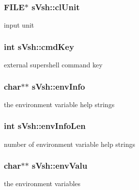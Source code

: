 \subsubsection[{cl\-Unit}]{\setlength{\rightskip}{0pt plus 5cm}F\-I\-L\-E$\ast$ s\-Vsh\-::cl\-Unit}\label{a00007_a61c33aa2071b43a85120b75d3984eeb3}


input unit 

\subsubsection[{cmd\-Key}]{\setlength{\rightskip}{0pt plus 5cm}int s\-Vsh\-::cmd\-Key}\label{a00007_aa246875bf82605333f30af61afe3ed54}


external supershell command key 

\subsubsection[{env\-Info}]{\setlength{\rightskip}{0pt plus 5cm}char$\ast$$\ast$ s\-Vsh\-::env\-Info}\label{a00007_a4b13b56b6059a20538b0eca39b1872b0}


the environment variable help strings 

\subsubsection[{env\-Info\-Len}]{\setlength{\rightskip}{0pt plus 5cm}int s\-Vsh\-::env\-Info\-Len}\label{a00007_a9f3e8263b78fe0574642e64ee6e30998}


number of environment variable help strings 

\subsubsection[{env\-Valu}]{\setlength{\rightskip}{0pt plus 5cm}char$\ast$$\ast$ s\-Vsh\-::env\-Valu}\label{a00007_a651413ef7fd726eef389669cff1f3e10}


the environment variables 

